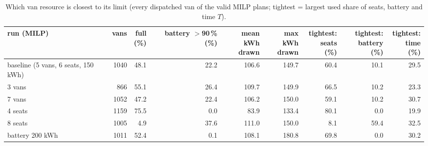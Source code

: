 \begin{table}[H]\centering
\small
\caption{Which van resource is closest to its limit (every dispatched van of the valid MILP plans; tightest = largest used share of seats, battery and time $T$).}\label{tab:vanlim}
\begin{adjustbox}{max width=\textwidth}\begin{tabular}{lrrrrrrrr}\toprule
run (MILP) & vans & \shortstack{full\\(\%)} & \shortstack{battery\\$>$90\,\% (\%)} & \shortstack{mean kWh\\drawn} & \shortstack{max kWh\\drawn} & \shortstack{tightest:\\seats (\%)} & \shortstack{tightest:\\battery (\%)} & \shortstack{tightest:\\time (\%)} \\ \midrule
baseline (5 vans, 6 seats, 150 kWh) & 1040 & 48.1 & 22.2 & 106.6 & 149.7 & 60.4 & 10.1 & 29.5 \\
3 vans & 866 & 55.1 & 26.4 & 109.7 & 149.9 & 66.5 & 10.2 & 23.3 \\
7 vans & 1052 & 47.2 & 22.4 & 106.2 & 150.0 & 59.1 & 10.2 & 30.7 \\
4 seats & 1159 & 75.5 & 0.0 & 83.9 & 133.4 & 80.1 & 0.0 & 19.9 \\
8 seats & 1005 & 4.9 & 37.6 & 111.0 & 150.0 & 8.1 & 59.4 & 32.5 \\
battery 200 kWh & 1011 & 52.4 & 0.1 & 108.1 & 180.8 & 69.8 & 0.0 & 30.2 \\
\bottomrule\end{tabular}\end{adjustbox}\end{table}
